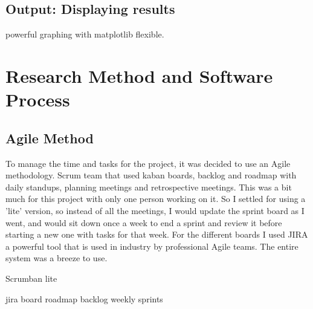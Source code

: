 \subsection{Output: Displaying results}

powerful graphing with matplotlib flexible.



\section{Research Method and Software Process}
\begin{comment}
You need to describe briefly the life cycle model or research method that you used. You do not need to write about all of the different process models that you are aware of. Focus on the process model or research method that you have used. It is possible that you needed to adapt an existing method to suit your project; clearly identify what you used and how you adapted it for your needs.

For the research-oriented projects, there needs to be a suitable process for the construction of the software elements that support your work.
\end{comment}


\subsection{Agile Method}
\begin{comment}
what is it?
why am i using it?
\end{comment}

To manage the time and tasks for the project, it was decided to use an Agile methodology. Scrum team that used kaban boards, backlog and roadmap with daily standups, planning meetings and retrospective meetings. This was a bit much for this project with only one person working on it. So I settled for using a 'lite' version, so instead of all the meetings, I would update the sprint board as I went, and would sit down once a week to end a sprint and review it before starting a new one with tasks for that week. For the different boards I used JIRA a powerful tool that is used in industry by professional Agile teams. The entire system was a breeze to use.

Scrumban lite

jira board
roadmap
backlog
weekly sprints


